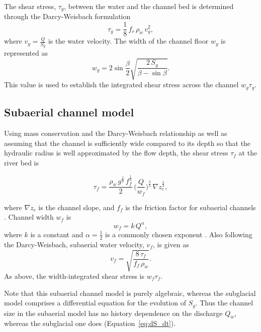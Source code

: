 \documentclass[draft]{agujournal2019}
\begin{document}
The shear stress, $\tau_g$, between the water and the channel bed is determined through the Darcy-Weisbach formulation
\begin{equation}
  \label{eq:tau_g}
  \tau_g=\frac{1}{8}\,f_r\,\rho_w\,v_g^2,
\end{equation}
% 
where $v_g = \frac{Q}{S_g}$ is the water velocity.
% 
The width of the channel floor $w_g$ is represented as
\begin{equation}
  \label{eq:dh2wc}
  w_g = 2  \sin \frac{\beta}{2} \sqrt{\frac{2\, S_g}{\beta -\sin \beta}}.
\end{equation}
% 
This value is used to establish the integrated shear stress across the channel $w_g\tau_g$.

\subsection{Subaerial channel  model}
\label{sect:fluv}

Using mass conservation and the Darcy-Weisbach relationship as well as assuming that the channel is sufficiently wide compared to its depth so that the hydraulic radius is well approximated by the flow depth,
the shear stress $\tau_f$ at the river bed is
\begin{linenomath*}
  \begin{equation}
    \label{eq:DW_tau}
    \tau_f=\frac{\rho_w\,g^{\frac{2}{3}}\,f_f^{\frac{1}{3}}}{2}\, \Big(\frac{Q}{w_f} \Big)^{\frac{2}{3}} \,\nabla z_c^{\frac{2}{3}},
  \end{equation}
\end{linenomath*}
where $\nabla z_c$ is the channel slope, and $f_f$ is the friction factor for subaerial channels \cite{tucker1997}.
Channel width $w_f$ is
\begin{equation}
  \label{eq:wcf}
  w_f = k \, Q^{\alpha},
\end{equation}
% 
where $k$ is a constant and $\alpha=\frac{1}{2}$ is a commonly chosen exponent \cite{leopold1953}.
Also following the Darcy-Weisbach, subaerial water velocity, $v_f$, is given as
\begin{equation}
  \label{eq:vf}
  v_f = \sqrt{\frac{8\,\tau_f}{f_f\,\rho_w}}.
\end{equation}
% 
As above, the width-integrated shear stress is $w_f\tau_f$.

Note that this subaerial channel model is purely algebraic, whereas the subglacial model comprises a differential equation for the evolution of $S_g$.
Thus the channel size in the subaerial model has no history dependence on the discharge $Q_w$, whereas the subglacial one does (Equation~\ref{eq:dS_dt}).
\end{document}
